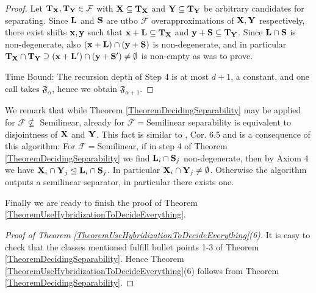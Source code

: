\begin{proof}
Let \(\mathbf{T}_{\mathbf{X}},\mathbf{T}_{\mathbf{Y}} \in \mathcal{F}\) with \(\mathbf{X} \subseteq \mathbf{T}_{\mathbf{X}}\) and \(\mathbf{Y} \subseteq \mathbf{T}_{\mathbf{Y}}\) be arbitrary candidates for separating. Since \(\mathbf{L}\) and \(\mathbf{S}\) are utbo \(\mathcal{F}\) overapproximations of \(\mathbf{X}, \mathbf{Y}\) respectively, there exist shifts \(\mathbf{x}, \mathbf{y}\) such that \(\mathbf{x}+\mathbf{L} \subseteq \mathbf{T}_{\mathbf{X}}\) and \(\mathbf{y}+\mathbf{S} \subseteq \mathbf{T}_{\mathbf{Y}}\). Since \(\mathbf{L} \cap \mathbf{S}\) is non-degenerate, also \((\mathbf{x}+\mathbf{L}) \cap (\mathbf{y}+\mathbf{S})\) is non-degenerate, and in particular \(\mathbf{T}_{\mathbf{X}} \cap \mathbf{T}_{\mathbf{Y}} \supseteq (\mathbf{x}+\mathbf{L}') \cap (\mathbf{y}+\mathbf{S}') \neq \emptyset\) is non-empty as was to prove.

Time Bound: The recursion depth of Step 4 is at most \(d+1\), a constant, and one call takes \(\mathfrak{F}_{\alpha}\), hence we obtain \(\mathfrak{F}_{\alpha+1}\).
\end{proof}

We remark that while Theorem \ref{TheoremDecidingSeparability} may be applied for \(\mathcal{F} \not \subseteq \) Semilinear, already for \(\mathcal{F}=\)Semilinear separability is equivalent to disjointness of \(\mathbf{X}\) and \(\mathbf{Y}\). This fact is similar to \cite{GuttenbergRE23}, Cor. 6.5 and is a consequence of this algorithm: For \(\mathcal{F}=\)Semilinear, if in step 4 of Theorem \ref{TheoremDecidingSeparability} we find \(\mathbf{L}_i \cap \mathbf{S}_j\) non-degenerate, then by Axiom 4 we have \(\mathbf{X}_i \cap \mathbf{Y}_j \trianglelefteq \mathbf{L}_i \cap \mathbf{S}_j\). In particular \(\mathbf{X}_i \cap \mathbf{Y}_j \neq \emptyset\). Otherwise the algorithm outputs a semilinear separator, in particular there exists one.

Finally we are ready to finish the proof of Theorem \ref{TheoremUseHybridizationToDecideEverything}.

\begin{proof}[Proof of Theorem \ref{TheoremUseHybridizationToDecideEverything}(6)]
It is easy to check that the classes mentioned fulfill bullet points 1-3 of Theorem \ref{TheoremDecidingSeparability}. Hence Theorem \ref{TheoremUseHybridizationToDecideEverything}(6) follows from Theorem \ref{TheoremDecidingSeparability}.
\end{proof}

